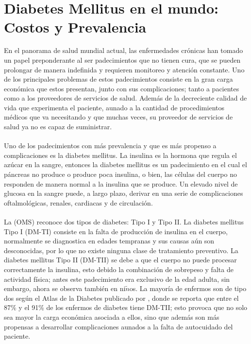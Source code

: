 \section{Diabetes Mellitus en el mundo: Costos y Prevalencia}
En el panorama de salud mundial actual, las enfermedades cr\'onicas han tomado un papel preponderante al ser padecimientos que no tienen cura, que se pueden prolongar de manera indefinida y requieren monitoreo y atenci\'on constante. Uno de los principales problemas de estos padecimientos consiste en la gran carga econ\'omica que estos presentan, junto con sus complicaciones; tanto a pacientes como a los proveedores de servicios de salud. Adem\'as de la decreciente calidad de vida que experimenta el paciente, aunado a la cantidad de procedimientos m\'edicos que va necesitando y que muchas veces, su proveedor de servicios de salud ya no es capaz de suministrar.\\
\\
Uno de los padecimientos con m\'as prevalencia y que es m\'as propenso a complicaciones es la diabetes mellitus. La insulina es la hormona que regula el az\'ucar en la sangre, entonces la diabetes mellitus es un padecimiento en el cual el p\'ancreas no produce o produce poca insulina, o bien, las c\'elulas del cuerpo no responden de manera normal a la insulina que se produce. Un elevado nivel de glucosa en la sangre puede, a largo plazo, derivar en una serie de complicaciones oftalmol\'ogicas, renales, cardiacas y de circulaci\'on.\\
\\
La \cite{FactSheetDiabetes} %
 (OMS) reconoce dos tipos de diabetes: Tipo I y Tipo II. La diabetes mellitus Tipo I (DM-TI) consiste en la falta de producci\'on de insulina en el cuerpo, normalmente se diagnostica en edades tempranas y sus causas a\'un son desconocidas, por lo que no existe ninguna clase de tratamiento preventivo. La diabetes mellitus Tipo II (DM-TII) se debe a que el cuerpo no puede procesar correctamente la insulina, esto debido la combinaci\'on de sobrepeso y falta de actividad f\'isica; antes este padecimiento era exclusivo de la edad adulta, sin embargo, ahora se observa tambi\'en en ni$\tilde{n}$os. La mayor\'ia de enfermos son de tipo dos seg\'un el Atlas de la Diabetes publicado por \cite{atlas2015international}, donde se reporta que entre el 87\% y el 91\% de los enfermos de diabetes tiene DM-TII; esto provoca que no solo sea mayor la carga econ\'omica asociada a ellos, sino que adem\'as son m\'as propensas a desarrollar complicaciones  aunados a la falta de autocuidado del paciente.\\
